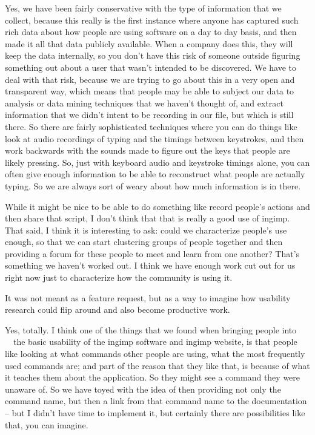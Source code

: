 { Yes, we have been fairly conservative with the type of information
that we collect, because this really is the first instance where anyone
has captured such rich data about how people are using software on a
day to day basis, and then made it all that data publicly available.
When a company does this, they will keep the data internally, so you
don't have this risk of someone outside figuring something out about a
user that wasn't intended to be discovered. We have to deal with that
risk, because we are trying to go about this in a very open and
transparent way, which means that people may be able to subject our
data to analysis or data mining techniques that we haven't thought of,
and extract information that we didn't intent to be recording in our
file, but which is still there. So there are fairly sophisticated
techniques where you can do things like look at audio recordings of
typing and the timings between keystrokes, and then work backwards with
the sounds made to figure out the keys that people are likely pressing.
So, just with keyboard audio and keystroke timings alone, you can often
give enough information to be able to reconstruct what people are
actually typing. So we are always sort of weary about how much
information is in there.\par

While it might be nice to be able to do something like record people's
actions and then share that script, I don't think that that is really a
good use of ingimp. That said, I think it is interesting to ask: could
we characterize people's use enough, so that we can start clustering
groups of people together and then providing a forum for these people
to meet and learn from one another? That's something we haven't worked
out. I think we have enough work cut out for us right now just to
characterize how the community is using it.\par

 It was not meant as a feature request, but as a way to imagine how
usability research could flip around and also become productive work.\par

 Yes, totally. I think one of the things that we found when
bringing people into \ \ the basic usability of the ingimp software and
ingimp website, is that people like looking at what commands other
people are using, what the most frequently used commands are; and part
of the reason that they like that, is because of what it teaches them
about the application. So they might see a command they were unaware
of. So we have toyed with the idea of then providing not only the
command name, but then a link from that command name to the
documentation {--} but I didn't have time to implement it, but
certainly there are possibilities like that, you can imagine.\par

}
